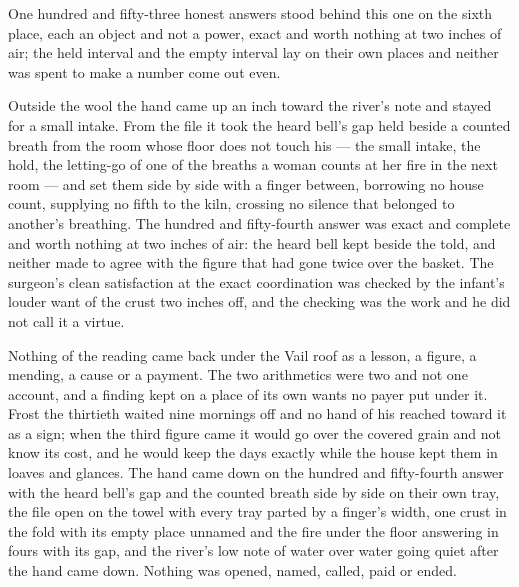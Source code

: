 One hundred and fifty-three honest answers stood behind this one on the sixth place, each an object and not a power, exact and worth nothing at two inches of air; the held interval and the empty interval lay on their own places and neither was spent to make a number come out even.

Outside the wool the hand came up an inch toward the river's note and stayed for a small intake. From the file it took the heard bell's gap held beside a counted breath from the room whose floor does not touch his --- the small intake, the hold, the letting-go of one of the breaths a woman counts at her fire in the next room --- and set them side by side with a finger between, borrowing no house count, supplying no fifth to the kiln, crossing no silence that belonged to another's breathing. The hundred and fifty-fourth answer was exact and complete and worth nothing at two inches of air: the heard bell kept beside the told, and neither made to agree with the figure that had gone twice over the basket. The surgeon's clean satisfaction at the exact coordination was checked by the infant's louder want of the crust two inches off, and the checking was the work and he did not call it a virtue.

Nothing of the reading came back under the Vail roof as a lesson, a figure, a mending, a cause or a payment. The two arithmetics were two and not one account, and a finding kept on a place of its own wants no payer put under it. Frost the thirtieth waited nine mornings off and no hand of his reached toward it as a sign; when the third figure came it would go over the covered grain and not know its cost, and he would keep the days exactly while the house kept them in loaves and glances. The hand came down on the hundred and fifty-fourth answer with the heard bell's gap and the counted breath side by side on their own tray, the file open on the towel with every tray parted by a finger's width, one crust in the fold with its empty place unnamed and the fire under the floor answering in fours with its gap, and the river's low note of water over water going quiet after the hand came down. Nothing was opened, named, called, paid or ended.
